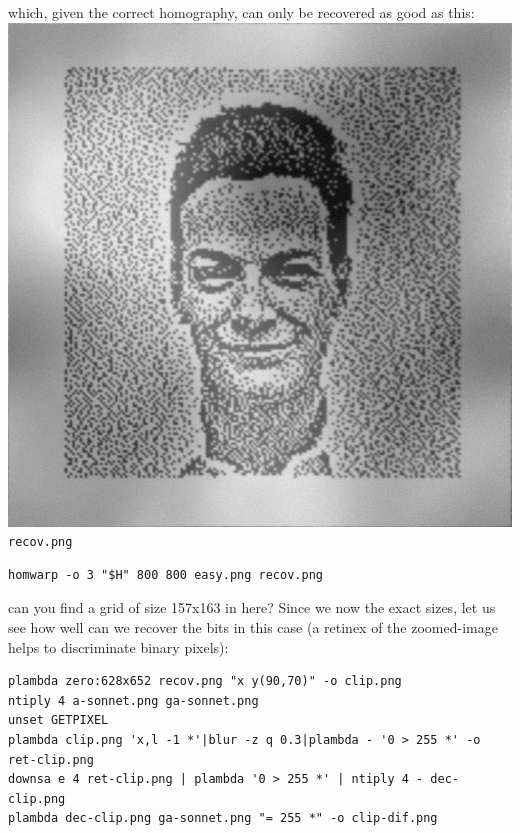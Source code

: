 which, given the correct  homography, can only be recovered as good as this:
\includegraphics{recov.png}\verb+recov.png+
\begin{verbatim}
homwarp -o 3 "$H" 800 800 easy.png recov.png
\end{verbatim}
can you find a grid of size 157x163 in here?  Since we now the exact sizes,
let us see how well can we recover the bits in this case (a retinex of the
zoomed-image helps to discriminate binary pixels):



\begin{verbatim}
plambda zero:628x652 recov.png "x y(90,70)" -o clip.png
ntiply 4 a-sonnet.png ga-sonnet.png
unset GETPIXEL
plambda clip.png 'x,l -1 *'|blur -z q 0.3|plambda - '0 > 255 *' -o ret-clip.png
downsa e 4 ret-clip.png | plambda '0 > 255 *' | ntiply 4 - dec-clip.png
plambda dec-clip.png ga-sonnet.png "= 255 *" -o clip-dif.png
\end{verbatim}
\begin{gallery}
\end{gallery}

